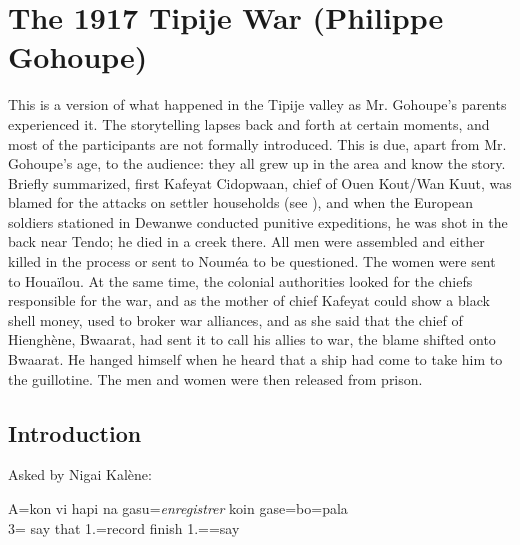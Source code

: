 \chapter{The 1917 Tipije War (Philippe Gohoupe)}
\label{text:tipije}
%


This is a version of what happened in the Tipije valley as Mr. Gohoupe's parents experienced it. The storytelling lapses back and forth at certain moments, and most of the participants are not formally introduced. This is due, apart from Mr. Gohoupe's age, to the audience: they all grew up in the area and know the story. Briefly summarized, first Kafeyat Cidopwaan, chief of Ouen Kout/Wan Kuut, was blamed for the attacks on settler households (see ), and when the European soldiers stationed in Dewanwe conducted punitive expeditions, he was shot in the back near Tendo; he died in a creek there. All men were assembled and either killed in the process or sent to Nouméa to be questioned. The women were sent to Houaïlou. At the same time, the colonial authorities looked for the chiefs responsible for the war, and as the mother of chief Kafeyat could show a black shell money, used to broker war alliances, and as she said that the chief of Hienghène, Bwaarat, had sent it to call his allies to war, the blame shifted onto Bwaarat. He hanged himself when he heard that a ship had come to take him to the guillotine. The men and women were then released from prison.\largerpage[2]

\section{Introduction} 

Asked by Nigai Kalène:

 \ea 
\gll A=kon vi hapi na gasu=\textit{enregistrer} koin gase=bo=pala\\ 
3= say that  1.=record finish 1.==say \\ \glt  {}
\z 

